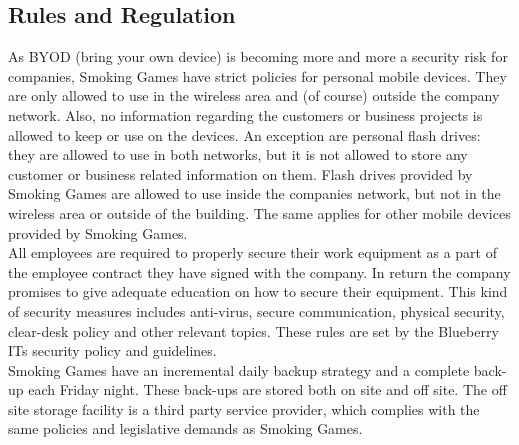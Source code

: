\subsection{Rules and Regulation}
As BYOD (bring your own device) is becoming more and more a security risk for companies, Smoking Games have strict policies for personal mobile devices. They are only allowed to use in the wireless area and (of course) outside the company network. Also, no information regarding the customers or business projects is allowed to keep or use on the devices. An exception are personal flash drives: they are allowed to use in both networks, but it is not allowed to store any customer or business related information on them. Flash drives provided by Smoking Games are allowed to use inside the companies network, but not in the wireless area or outside of the building. The same applies for other mobile devices provided by Smoking Games.\\
All employees are required to properly secure their work equipment as a part of the employee contract they have signed with the company. In return the company promises to give adequate education on how to secure their equipment. This kind of security measures includes anti-virus,
secure communication, physical security, clear-desk policy and other relevant topics. These rules are set by the Blueberry ITs security policy and guidelines.\\
Smoking Games have an incremental daily backup strategy and a complete back-up each Friday night. These back-ups are stored both on site and off site. The off site storage facility is a third party service provider, which complies with the same policies and legislative demands as Smoking Games.\\